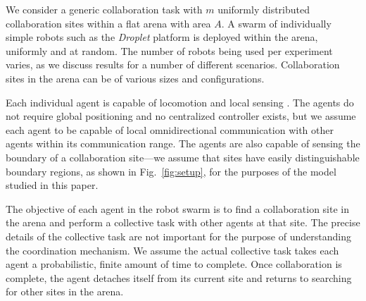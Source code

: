 \documentclass{svmult}  %
\begin{document}
We consider a generic collaboration task with $m$ uniformly distributed collaboration sites within a flat arena with area $A$. A swarm of individually simple robots such as the \emph{Droplet} platform \cite{Farrow2014,Klingner2014} is deployed within the arena, uniformly and at random. The number of robots being used per experiment varies, as we discuss results for a number of different scenarios. Collaboration sites in the arena can be of various sizes and configurations.

Each individual agent is capable of locomotion \cite{Klingner2014} and local sensing \cite{Farrow2014}. The agents do not require global positioning and no centralized controller exists, but we assume each agent to be capable of local omnidirectional communication with other agents within its communication range. The agents are also capable of sensing the boundary of a collaboration site---we assume that sites have easily distinguishable boundary regions, as shown in Fig.~\ref{fig:setup}, for the purposes of the model studied in this paper. 

The objective of each agent in the robot swarm is to find a collaboration site in the arena and perform a collective task with other agents at that site. The precise details of the collective task are not important for the purpose of understanding the coordination mechanism. We assume the actual collective task takes each agent a probabilistic, finite amount of time to complete. Once collaboration is complete, the agent detaches itself from its current site and returns to searching for other sites in the arena. 
\end{document}
